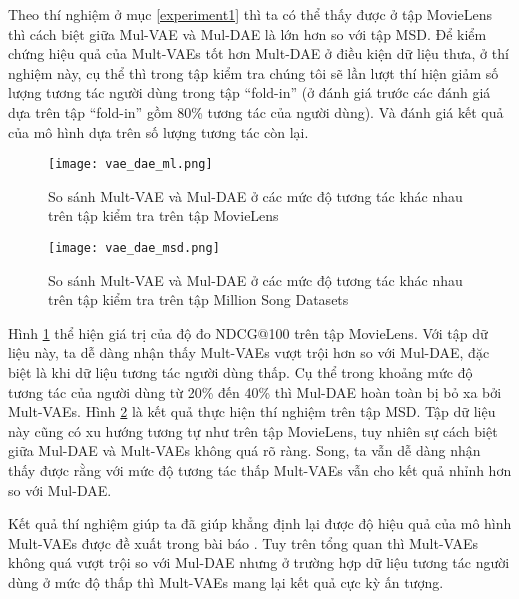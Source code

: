     Theo thí nghiệm ở mục \ref{experiment1} thì ta có thể thấy được ở tập MovieLens thì cách biệt giữa Mul-VAE và Mul-DAE là lớn hơn so với tập MSD.
    Để kiểm chứng hiệu quả của Mult-VAEs tốt hơn Mult-DAE ở điều kiện dữ liệu thưa, ở thí nghiệm này, cụ thể thì trong tập kiểm tra chúng tôi sẽ lần lượt thí hiện giảm số lượng tương tác người dùng trong tập ``fold-in'' (ở đánh giá trước các đánh giá dựa trên tập ``fold-in'' gồm 80\% tương tác của người dùng). Và đánh giá kết quả của mô hình dựa trên số lượng tương tác còn lại.
    
    \begin{figure}
        \centering
        \texttt{[image: vae\_dae\_ml.png]}
        \caption{So sánh Mult-VAE và Mul-DAE ở các mức độ tương tác khác nhau trên tập kiểm tra trên tập MovieLens}
        \label{fig_vae_dae_ml}
    \end{figure}
    \begin{figure}
        \centering
        \texttt{[image: vae\_dae\_msd.png]}
        \caption{So sánh Mult-VAE và Mul-DAE ở các mức độ tương tác khác nhau trên tập kiểm tra trên tập Million Song Datasets}
        \label{fig_vae_dae_msd}
    \end{figure}

    Hình \ref{fig_vae_dae_ml} thể hiện giá trị của độ đo NDCG@100 trên tập MovieLens. 
    Với tập dữ liệu này, ta dễ dàng nhận thấy Mult-VAEs vượt trội hơn so với Mul-DAE, đặc biệt là khi dữ liệu tương tác người dùng thấp.
    Cụ thể trong khoảng mức độ tương tác của người dùng từ 20\% đến 40\% thì Mul-DAE hoàn toàn bị bỏ xa bởi Mult-VAEs.
    Hình \ref{fig_vae_dae_msd} là kết quả thực hiện thí nghiệm trên tập MSD.
    Tập dữ liệu này cũng có xu hướng tương tự như trên tập MovieLens, tuy nhiên sự cách biệt giữa Mul-DAE và Mult-VAEs không quá rõ ràng.
    Song, ta vẫn dễ dàng nhận thấy được rằng với mức độ tương tác thấp Mult-VAEs vẫn cho kết quả nhỉnh hơn so với Mul-DAE.

    Kết quả thí nghiệm giúp ta đã giúp khẳng định lại được độ hiệu quả của mô hình Mult-VAEs được đề xuất trong bài báo \cite{mvae}. 
    Tuy trên tổng quan thì Mult-VAEs không quá vượt trội so với Mul-DAE nhưng ở trường hợp dữ liệu tương tác người dùng ở mức độ thấp thì Mult-VAEs mang lại kết quả cực kỳ ấn tượng.




